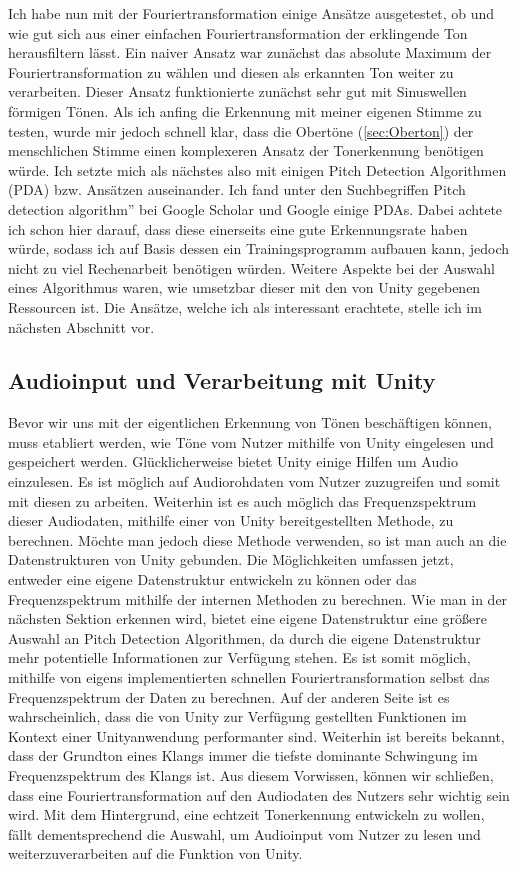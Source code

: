 Ich habe nun mit der Fouriertransformation einige Ansätze ausgetestet, ob und wie gut sich aus einer einfachen Fouriertransformation der erklingende Ton herausfiltern lässt. Ein naiver Ansatz war zunächst das absolute Maximum der Fouriertransformation zu wählen und diesen als erkannten Ton weiter zu verarbeiten. Dieser Ansatz funktionierte zunächst sehr gut mit Sinuswellen förmigen Tönen. Als ich anfing die Erkennung mit meiner eigenen Stimme zu testen, wurde mir jedoch schnell klar, dass die Obertöne (\ref{sec:Oberton}) der menschlichen Stimme einen komplexeren Ansatz der Tonerkennung benötigen würde. Ich setzte mich als nächstes also mit einigen Pitch Detection Algorithmen (PDA) bzw. Ansätzen auseinander. Ich fand unter den Suchbegriffen \glqq Pitch detection algorithm'' bei Google Scholar und Google einige PDAs. Dabei achtete ich schon hier darauf, dass diese einerseits eine gute Erkennungsrate haben würde, sodass ich auf Basis dessen ein Trainingsprogramm aufbauen kann, jedoch nicht zu viel Rechenarbeit benötigen würden. Weitere Aspekte bei der Auswahl eines Algorithmus waren, wie umsetzbar dieser mit den von Unity gegebenen Ressourcen ist. Die Ansätze, welche ich als interessant erachtete, stelle ich im nächsten Abschnitt vor. 


\subsection{Audioinput und Verarbeitung mit Unity}
Bevor wir uns mit der eigentlichen Erkennung von Tönen beschäftigen können, muss etabliert werden, wie Töne vom Nutzer mithilfe von Unity eingelesen und gespeichert werden. Glücklicherweise bietet Unity einige Hilfen um Audio einzulesen. Es ist möglich auf Audiorohdaten vom Nutzer zuzugreifen und somit mit diesen zu arbeiten. Weiterhin ist es auch möglich das Frequenzspektrum dieser Audiodaten, mithilfe einer von Unity bereitgestellten Methode, zu berechnen. Möchte man jedoch diese Methode verwenden, so ist man auch an die Datenstrukturen von Unity gebunden. Die Möglichkeiten umfassen jetzt, entweder eine eigene Datenstruktur entwickeln zu können oder das Frequenzspektrum mithilfe der internen Methoden zu berechnen. Wie man in der nächsten Sektion erkennen wird, bietet eine eigene Datenstruktur eine größere Auswahl an Pitch Detection Algorithmen, da durch die eigene Datenstruktur mehr potentielle Informationen zur Verfügung stehen. Es ist somit möglich, mithilfe von eigens implementierten schnellen Fouriertransformation selbst das Frequenzspektrum der Daten zu berechnen. Auf der anderen Seite ist es wahrscheinlich, dass die von Unity zur Verfügung gestellten Funktionen im Kontext einer Unityanwendung performanter sind. Weiterhin ist bereits bekannt, dass der Grundton eines Klangs immer die tiefste dominante Schwingung im Frequenzspektrum des Klangs ist. Aus diesem Vorwissen, können wir schließen, dass eine Fouriertransformation auf den Audiodaten des Nutzers sehr wichtig sein wird. Mit dem Hintergrund, eine echtzeit Tonerkennung entwickeln zu wollen, fällt dementsprechend die Auswahl, um Audioinput vom Nutzer zu lesen und weiterzuverarbeiten auf die Funktion von Unity. 

